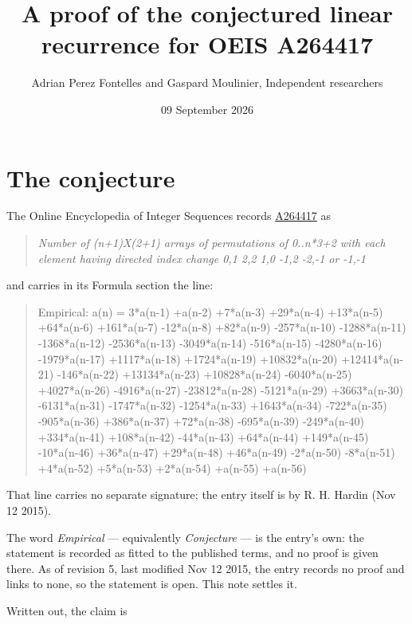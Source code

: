 \documentclass[11pt]{article}
\title{A proof of the conjectured linear recurrence for OEIS A264417}
\author{Adrian Perez Fontelles and Gaspard Moulinier, Independent researchers}
\date{09 September 2026}
\theoremstyle{definition}
\begin{document}
\maketitle
\section{The conjecture}

The Online Encyclopedia of Integer Sequences records \href{https://oeis.org/A264417}{A264417} as

\begin{quote}\itshape Number of (n+1)X(2+1) arrays of permutations of 0..n*3+2 with each element having directed index change 0,1 2,2 1,0 -1,2 -2,-1 or -1,-1\end{quote}

and carries in its Formula section the line:

\begin{quote}\ttfamily Empirical: a(n) = 3*a(n-1) +a(n-2) +7*a(n-3) +29*a(n-4) +13*a(n-5) +64*a(n-6) +161*a(n-7) -12*a(n-8) +82*a(n-9) -257*a(n-10) -1288*a(n-11) -1368*a(n-12) -2536*a(n-13) -3049*a(n-14) -516*a(n-15) -4280*a(n-16) -1979*a(n-17) +1117*a(n-18) +1724*a(n-19) +10832*a(n-20) +12414*a(n-21) -146*a(n-22) +13134*a(n-23) +10828*a(n-24) -6040*a(n-25) +4027*a(n-26) -4916*a(n-27) -23812*a(n-28) -5121*a(n-29) +3663*a(n-30) -6131*a(n-31) -1747*a(n-32) -1254*a(n-33) +1643*a(n-34) -722*a(n-35) -905*a(n-36) +386*a(n-37) +72*a(n-38) -695*a(n-39) -249*a(n-40) +334*a(n-41) +108*a(n-42) -44*a(n-43) +64*a(n-44) +149*a(n-45) -10*a(n-46) +36*a(n-47) +29*a(n-48) +46*a(n-49) -2*a(n-50) -8*a(n-51) +4*a(n-52) +5*a(n-53) +2*a(n-54) +a(n-55) +a(n-56)\end{quote}

That line carries no separate signature; the entry itself is by R. H. Hardin (Nov 12 2015).

The word {\itshape Empirical} --- equivalently {\itshape Conjecture} --- is the entry's own: the statement is recorded as fitted to the published terms, and no proof is given there. As of revision 5, last modified Nov 12 2015, the entry records no proof and links to none, so the statement is open. This note settles it.

Written out, the claim is
\end{document}

